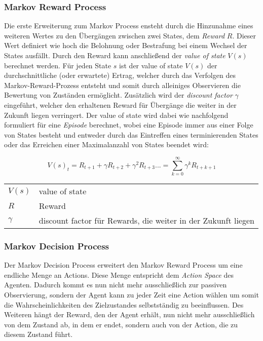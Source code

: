 \documentclass[11pt]{scrartcl}
\makeatletter
\newenvironment{conditions}
  {\par\vspace{\abovedisplayskip}\noindent\begin{tabular}{>{$}l<{$} @{${}:{}$} l}}
  {\end{tabular}\par\vspace{\belowdisplayskip}}
\makeatother
\begin{document}
\subsubsection{Markov Reward Process}
Die erste Erweiterung zum Markov Process ensteht durch die Hinzunahme eines weiteren Wertes zu den 
Übergängen zwischen zwei States, dem \textit{Reward} $R$. Dieser Wert definiert wie hoch die Belohnung
oder Bestrafung bei einem Wechsel der States ausfällt. Durch den Reward kann anschließend der
\textit{value of state} $V(s)$ berechnet werden. Für jeden State $s$ ist der value of state $V(s)$
der durchschnittliche (oder erwartete) Ertrag, welcher durch das Verfolgen des Markov-Reward-Prozess
entsteht und somit durch alleiniges Observieren die Bewertung von Zuständen ermöglicht.
Zusätzlich wird der \textit{discount factor} $\gamma$ eingeführt, welcher den erhaltenen Reward
für Übergänge die weiter in der Zukunft liegen verringert. Der value of state wird dabei wie
nachfolgend formuliert für eine \textit{Episode} berechnet, wobei eine Episode immer aus einer
Folge von States besteht und entweder durch das Eintreffen eines terminierenden States oder das
Erreichen einer Maximalanzahl von States beendet wird:

\begin{equation}
V(s)_t = R_{t+1} + \gamma R_{t+2} + \gamma^2 R_{t+3} ... = \sum_{k=0}^\infty \gamma^{k} R_{t+k+1}
\label{eq:value-of-state}
\end{equation} 

\begin{conditions}
 V(s)     	&  value of state \\
 R	     	&  Reward \\   
 \gamma 	&  discount factor für Rewards, die weiter in der Zukunft liegen
\end{conditions}

\subsubsection{Markov Decision Process}
Der Markov Decision Process erweitert den Markov Reward Process um eine endliche Menge an Actions.
Diese Menge entspricht dem \textit{Action Space} des Agenten. Dadurch kommt es nun nicht mehr
ausschließlich zur passiven Observierung, sondern der Agent kann zu jeder Zeit eine Action wählen um
somit die Wahrscheinlichkeiten des Zielzustandes selbstständig zu beeinflussen. Des Weiteren hängt 
der Reward, den der Agent erhält, nun nicht mehr ausschließlich von dem Zustand ab, in dem er endet,
sondern auch von der Action, die zu diesem Zustand führt. 
\end{document}
